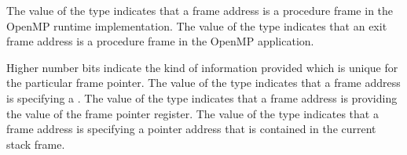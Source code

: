 \descr
The value  of the  type
indicates that a frame address is a procedure frame in the OpenMP
runtime implementation.
The value  of the  type
indicates that an exit frame address is a procedure frame in the OpenMP
application.

Higher number bits indicate the kind of information provided which is unique
for the particular frame pointer.
The value  of the  type
indicates that a frame address is specifying a .
The value  of the  type
indicates that a frame address is providing the value of the frame pointer
register.
The value  of the  type
indicates that a frame address is specifying a pointer address that is
contained in the current stack frame.
